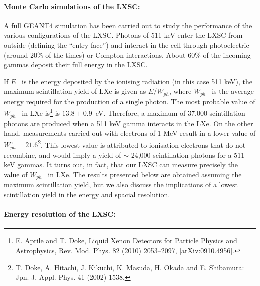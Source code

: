 \paragraph{Monte Carlo simulations of the LXSC:}


A full GEANT4 simulation has been carried out to study the performance of the various configurations of the LXSC. Photons of 511 keV enter the LXSC from outside (defining the ``entry face'') and interact in the cell 
through photoelectric (around 20\% of the times) or Compton interactions. About 60\% of the incoming gammas deposit their full energy in the LXSC. 

If $E$~ is the energy deposited by the ionising radiation (in this case 511 keV), the maximum scintillation yield of LXe is given as $E/W_{ph}$, where $W_{ph}$~ is the average energy required for the production of a single photon. The most probable value of $W_{ph}$~ in LXe  is\footnote{E. Aprile and T. Doke, Liquid Xenon Detectors for Particle Physics and Astrophysics, Rev. Mod. Phys. 82 (2010) 2053–2097, [arXiv:0910.4956].} is $13.8 \pm 0.9$~eV. Therefore, a maximum of 37,000 scintillation photons are produced when a 511 keV gamma interacts in the LXe. On the other hand, measurements carried out with electrons of 1 MeV result in a lower value of $W_{ph}^e = 21.6$\footnote{T. Doke, A. Hitachi, J. Kikuchi, K. Masuda, H. Okada and E. Shibamura: Jpn. J. Appl. Phys. 41 (2002) 1538.}. This lowest value is attributed to ionisation electrons that do not recombine, and would imply a yield of $\sim$ 24,000 scintillation photons for a 511 keV gammas. It turns out, in fact, that our LXSC can measure precisely the value of $W_{ph}$~ in LXe. The results presented below are obtained assuming the maximum scintillation yield, but we also discuss the implications of a lowest scintillation yield in the energy and spacial resolution. 

\paragraph{Energy resolution of the LXSC:}

